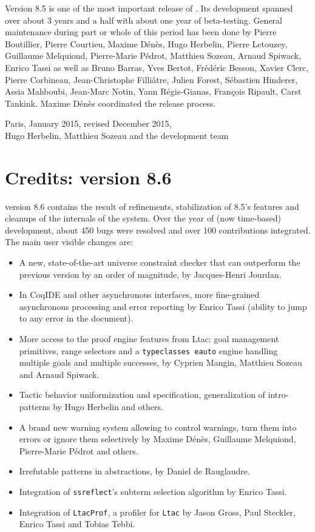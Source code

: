 Version 8.5 is one of the most important release of {\Coq}. Its
development spanned over about 3 years and a half with about one year
of beta-testing. General maintenance during part or whole of this
period has been done by Pierre Boutillier, Pierre Courtieu, Maxime
Dénès, Hugo Herbelin, Pierre Letouzey, Guillaume Melquiond,
Pierre-Marie Pédrot, Matthieu Sozeau, Arnaud Spiwack, Enrico Tassi as
well as Bruno Barras, Yves Bertot, Frédéric Besson, Xavier Clerc,
Pierre Corbineau, Jean-Christophe Filliâtre, Julien Forest, Sébastien
Hinderer, Assia Mahboubi, Jean-Marc Notin, Yann Régis-Gianas, François
Ripault, Carst Tankink. Maxime Dénès coordinated the release process.

\begin{flushright}
Paris, January 2015, revised December 2015,\\
Hugo Herbelin, Matthieu Sozeau and the {\Coq} development team\\
\end{flushright}

\section*{Credits: version 8.6}

{\Coq} version 8.6 contains the result of refinements, stabilization of
8.5's features and cleanups of the internals of the system. Over the
year of (now time-based) development, about 450 bugs were resolved and
over 100 contributions integrated. The main user visible changes are:
\begin{itemize}
\item A new, state-of-the-art universe constraint checker that
  can outperform the previous version by an order of magnitude, by
  Jacques-Henri Jourdan.
\item In CoqIDE and other asynchronous interfaces, more fine-grained
  asynchronous processing and error reporting by Enrico Tassi (ability
  to jump to any error in the document).
\item More access to the proof engine features from Ltac: goal
  management primitives, range selectors and a {\tt typeclasses
    eauto} engine handling multiple goals and multiple successes, by
  Cyprien Mangin, Matthieu Sozeau and Arnaud Spiwack.
\item Tactic behavior uniformization and specification, generalization
  of intro-patterns by Hugo Herbelin and others.
\item A brand new warning system allowing to control warnings, turn them
  into errors or ignore them selectively by Maxime Dénès, Guillaume
  Melquiond, Pierre-Marie Pédrot and others.
\item Irrefutable patterns in abstractions, by Daniel de Rauglaudre.
\item Integration of {\tt ssreflect}'s subterm selection algorithm by
  Enrico Tassi.
\item Integration of {\tt LtacProf}, a profiler for {\tt Ltac} by Jason
  Gross, Paul Steckler, Enrico Tassi and Tobias Tebbi.
\end{itemize}

